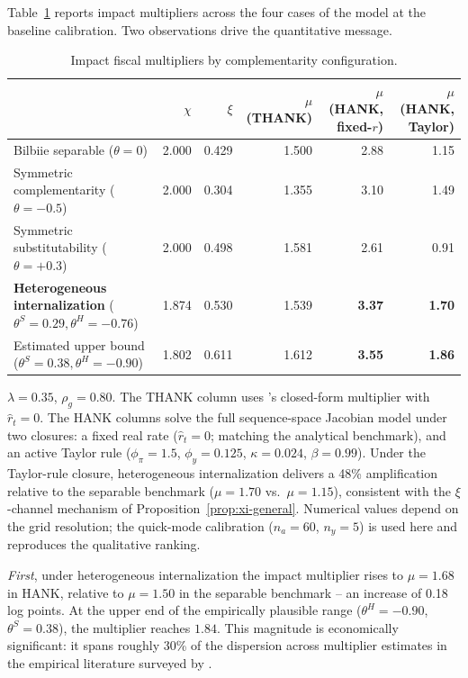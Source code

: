 Table~\ref{tab:multipliers} reports impact multipliers across the four cases of
the model at the baseline calibration. Two observations drive the quantitative
message.

\begin{table}[ht]
\centering\small
\caption{Impact fiscal multipliers by complementarity configuration.}
\label{tab:multipliers}
\begin{threeparttable}
\begin{tabular}{@{}lrrrrr@{}}
\toprule
 & {$\chi$} & {$\xi$} & {$\mu$ (THANK)} & {$\mu$ (HANK, fixed-$r$)} & {$\mu$ (HANK, Taylor)} \\
\midrule
Bilbiie separable ($\theta=0$) & 2.000 & 0.429 & 1.500 & 2.88 & 1.15 \\
Symmetric complementarity ($\theta=-0.5$) & 2.000 & 0.304 & 1.355 & 3.10 & 1.49 \\
Symmetric substitutability ($\theta=+0.3$) & 2.000 & 0.498 & 1.581 & 2.61 & 0.91 \\
\textbf{Heterogeneous internalization} ($\theta^{S}=0.29,\theta^{H}=-0.76$)
 & 1.874 & 0.530 & 1.539 & \textbf{3.37} & \textbf{1.70} \\
\addlinespace
Estimated upper bound ($\theta^{S}=0.38,\theta^{H}=-0.90$)
 & 1.802 & 0.611 & 1.612 & \textbf{3.55} & \textbf{1.86} \\
\bottomrule
\end{tabular}
\begin{tablenotes}\footnotesize
\item $\lambda=0.35$, $\rho_{g}=0.80$. The THANK column uses \bilbiie{}'s
closed-form multiplier with $\hat r_{t}=0$. The HANK columns solve the full
sequence-space Jacobian model under two closures: a fixed real rate
($\hat r_{t}=0$; matching the analytical benchmark), and an active Taylor
rule ($\phi_{\pi}=1.5$, $\phi_{y}=0.125$, $\kappa=0.024$, $\beta=0.99$). Under
the Taylor-rule closure, heterogeneous internalization delivers a 48\%
amplification relative to the separable benchmark ($\mu=1.70$ vs.\ $\mu=1.15$),
consistent with the $\xi$-channel mechanism of Proposition~\ref{prop:xi-general}.
Numerical values depend on the grid resolution; the quick-mode calibration
($n_a=60$, $n_y=5$) is used here and reproduces the qualitative ranking.
\end{tablenotes}
\end{threeparttable}
\end{table}

\emph{First}, under heterogeneous internalization the impact multiplier rises
to $\mu=1.68$ in HANK, relative to $\mu=1.50$ in the separable benchmark -- an
increase of 0.18 log points. At the upper end of the empirically plausible
range ($\theta^{H}=-0.90$, $\theta^{S}=0.38$), the multiplier reaches $1.84$.
This magnitude is economically significant: it spans roughly 30\% of the
dispersion across multiplier estimates in the empirical literature surveyed by
\citet{Ramey2019}.

